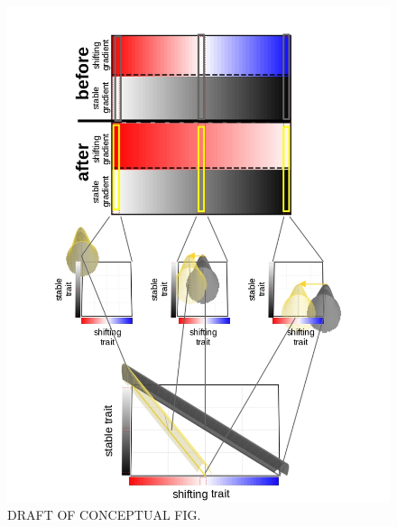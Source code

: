 \documentclass[9pt,twocolumn,twoside,lineno]{pnas-new}
\begin{document}
\begin{figure}%
\centering
\includegraphics[width=11.4cm]{pub/conceptual_fig_labeled_MOCK}
\caption{DRAFT OF CONCEPTUAL FIG.}
\label{tab:conceptual}
\end{figure}
\end{document}
